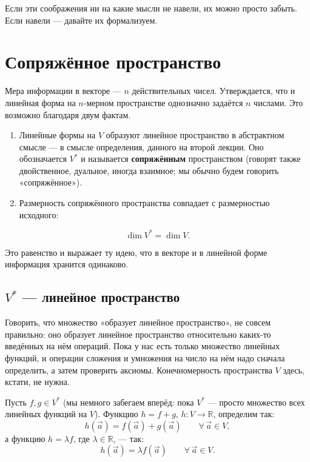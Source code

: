 \documentclass[11pt,a4paper]{article}
\begin{document}

Если эти соображения ни на какие мысли не навели, их можно просто забыть. Если навели — давайте их формализуем.

\section{Сопряжённое пространство}

Мера информации в векторе — $n$ действительных чисел. Утверждается, что и линейная форма на $n$-мерном пространстве однозначно задаётся $n$ числами. Это возможно благодаря двум фактам.

\begin{enumerate}
\item Линейные формы на $V$ образуют линейное пространство в абстрактном смысле — в смысле определения, данного на второй лекции. Оно обозначается $V^*$ и называется \textbf{сопряжённым} пространством (говорят также двойственное, дуальное, иногда взаимное; мы обычно будем говорить «сопряжённое»).
\item Размерность сопряжённого пространства совпадает с размерностью исходного:
\end{enumerate}

\[
\dim V^* = \dim V.
\]

Это равенство и выражает ту идею, что в векторе и в линейной форме информация хранится одинаково.

\subsection{$V^*$ — линейное пространство}

Говорить, что множество «образует линейное пространство», не совсем правильно: оно образует линейное пространство относительно каких-то введённых на нём операций. Пока у нас есть только множество линейных функций, и операции сложения и умножения на число на нём надо сначала определить, а затем проверить аксиомы. Конечномерность пространства $V$ здесь, кстати, не нужна.

Пусть $f, g \in V^*$ (мы немного забегаем вперёд: пока $V^*$ — просто множество всех линейных функций на $V$). Функцию $h = f + g$, $h\colon V \to \mathbb{R}$, определим так:
\[
h(\vec a) = f(\vec a) + g(\vec a) \qquad \forall\, \vec a \in V,
\]
а функцию $h = \lambda f$, где $\lambda \in \mathbb{R}$, — так:
\[
h(\vec a) = \lambda f(\vec a) \qquad \forall\, \vec a \in V.
\]
\end{document}
